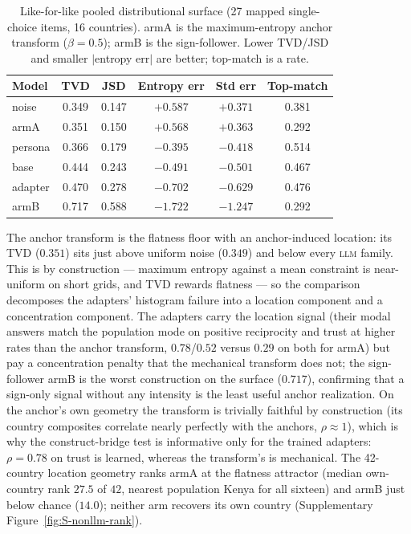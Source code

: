\documentclass[10pt,letterpaper]{article}
\newcommand{\LLM}{\textsc{llm}}
\begin{document}
\begin{table}[H]
\centering\small
\caption{Like-for-like pooled distributional surface (27 mapped single-choice items, 16 countries). armA is the maximum-entropy anchor transform ($\beta=0.5$); armB is the sign-follower. Lower TVD/JSD and smaller $|$entropy err$|$ are better; top-match is a rate.}\label{tab:res-nonllm}
\begin{tabular}{lccccc}
\toprule
Model & TVD & JSD & Entropy err & Std err & Top-match\\
\midrule
noise & 0.349 & 0.147 & $+0.587$ & $+0.371$ & 0.381\\
armA & 0.351 & 0.150 & $+0.568$ & $+0.363$ & 0.292\\
persona & 0.366 & 0.179 & $-0.395$ & $-0.418$ & 0.514\\
base & 0.444 & 0.243 & $-0.491$ & $-0.501$ & 0.467\\
adapter & 0.470 & 0.278 & $-0.702$ & $-0.629$ & 0.476\\
armB & 0.717 & 0.588 & $-1.722$ & $-1.247$ & 0.292\\
\bottomrule
\end{tabular}
\end{table}

The anchor transform is the flatness floor with an anchor-induced location: its TVD ($0.351$) sits just above uniform noise ($0.349$) and below every \LLM{} family. This is by construction --- maximum entropy against a mean constraint is near-uniform on short grids, and TVD rewards flatness --- so the comparison decomposes the adapters' histogram failure into a location component and a concentration component. The adapters carry the location signal (their modal answers match the population mode on positive reciprocity and trust at higher rates than the anchor transform, $0.78$/$0.52$ versus $0.29$ on both for armA) but pay a concentration penalty that the mechanical transform does not; the sign-follower armB is the worst construction on the surface ($0.717$), confirming that a sign-only signal without any intensity is the least useful anchor realization. On the anchor's own geometry the transform is trivially faithful by construction (its country composites correlate nearly perfectly with the anchors, $\rho\approx 1$), which is why the construct-bridge test is informative only for the trained adapters: $\rho=0.78$ on trust is learned, whereas the transform's is mechanical. The 42-country location geometry ranks armA at the flatness attractor (median own-country rank $27.5$ of $42$, nearest population Kenya for all sixteen) and armB just below chance ($14.0$); neither arm recovers its own country (Supplementary Figure~\ref{fig:S-nonllm-rank}).
\end{document}
